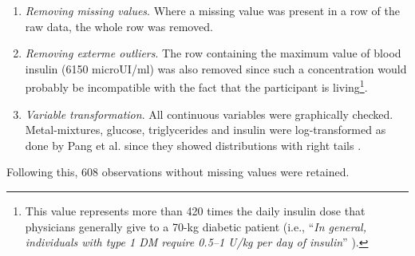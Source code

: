 \begin{enumerate}
\item \emph{Removing missing values}. Where a missing value was present in a row of the raw data, the whole row was removed.
\item \emph{Removing exterme outliers}. The row containing the maximum value of blood insulin (6150 microUI/ml) was also removed since such a concentration would probably be incompatible with the fact that the participant is living\footnote{This value represents more than 420 times the daily insulin dose that physicians generally give to a 70-kg diabetic patient (i.e., ``\emph{In general, individuals with type 1 DM require 0.5–1 U/kg per day of insulin}'' \cite{kasper_harrisons_2015}).}.
\item \emph{Variable transformation}. All continuous variables were graphically checked. Metal-mixtures, glucose, triglycerides and insulin were log-transformed as done by Pang et al. since they showed distributions with right tails \cite{pang_metal_2016}.
\end{enumerate}

Following this, $608$ observations without missing values were retained.


